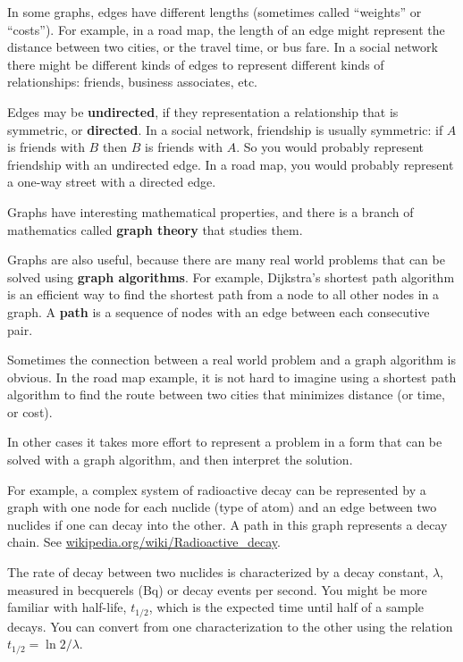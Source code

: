 \documentclass[10pt]{book}
\begin{document}
In some graphs, edges have different lengths (sometimes
called ``weights'' or ``costs'').  For example, in a road map, the
length of an edge might represent the distance between
two cities, or the travel time, or bus fare.
In a social network there might be different kinds of
edges to represent different kinds of relationships: friends,
business associates, etc.

Edges may be {\bf undirected}, if they representation a relationship
that is symmetric, or {\bf directed}.  In a social network,
friendship is usually symmetric: if $A$ is friends with $B$ then
$B$ is friends with $A$.  So you would probably represent friendship
with an undirected edge.  In a road map, you would probably represent
a one-way street with a directed edge.

Graphs have interesting mathematical properties, and
there is a branch of mathematics called {\bf graph theory}
that studies them.

Graphs are also useful, because there are many real world
problems that can be solved using {\bf graph algorithms}.
For example, Dijkstra's shortest path algorithm is an efficient
way to find the shortest path from a node to all
other nodes in a graph.  A {\bf path} is a sequence of nodes
with an edge between each consecutive pair.

Sometimes the connection between a real world problem and
a graph algorithm is obvious.  In the road map example, it is
not hard to imagine using a shortest path algorithm to find
the route between two cities that minimizes distance (or time,
or cost).

In other cases it takes more effort to represent a problem in a form
that can be solved with a graph algorithm, and then interpret the
solution.

For example, a complex system of radioactive decay
can be represented by a
graph with one node for each nuclide (type of atom) and an edge
between two nuclides if one can decay into the other.  A path in this
graph represents a decay chain.
See \url{wikipedia.org/wiki/Radioactive_decay}.

The rate of decay between two nuclides is characterized by a decay
constant, $\lambda$, measured in becquerels (Bq) or decay events per
second.  You might be more familiar with half-life, $t_{1/2}$, which
is the expected time until half of a sample decays.  You can convert
from one characterization to the other using the relation $t_{1/2} =
\ln 2 / \lambda$.
\end{document}
